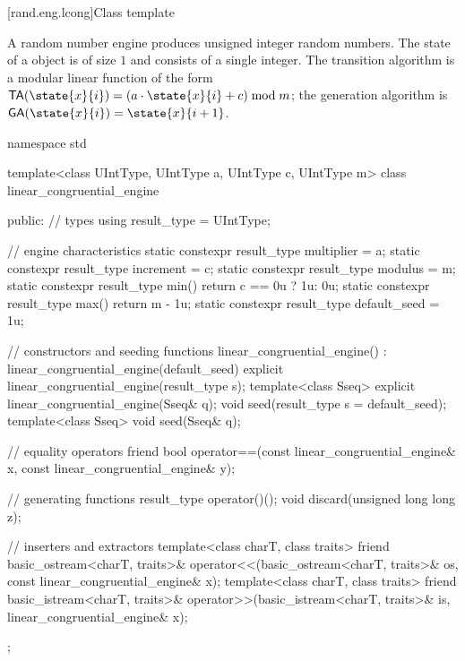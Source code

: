 
[rand.eng.lcong]{Class template }%
%

\pnum
A  random number engine
produces unsigned integer random numbers.
The state 
of a  object 
is of size $1$
and consists of a single integer.
The transition algorithm
is a modular linear function of the form
$\mathsf{TA}(\state{x}{i}) = (a \cdot \state{x}{i} + c) \bmod m$;
the generation algorithm
is $\mathsf{GA}(\state{x}{i}) = \state{x}{i+1}$.

%
%
\begin{codeblock}
namespace std {
  template<class UIntType, UIntType a, UIntType c, UIntType m>
  class linear_congruential_engine {
  public:
    // types
    using result_type = UIntType;

    // engine characteristics
    static constexpr result_type multiplier = a;
    static constexpr result_type increment = c;
    static constexpr result_type modulus = m;
    static constexpr result_type min() { return c == 0u ? 1u: 0u; }
    static constexpr result_type max() { return m - 1u; }
    static constexpr result_type default_seed = 1u;

    // constructors and seeding functions
    linear_congruential_engine() : linear_congruential_engine(default_seed) {}
    explicit linear_congruential_engine(result_type s);
    template<class Sseq> explicit linear_congruential_engine(Sseq& q);
    void seed(result_type s = default_seed);
    template<class Sseq> void seed(Sseq& q);

    // equality operators
    friend bool operator==(const linear_congruential_engine& x,
                           const linear_congruential_engine& y);

    // generating functions
    result_type operator()();
    void discard(unsigned long long z);

    // inserters and extractors
    template<class charT, class traits>
      friend basic_ostream<charT, traits>&
        operator<<(basic_ostream<charT, traits>& os, const linear_congruential_engine& x);
    template<class charT, class traits>
      friend basic_istream<charT, traits>&
        operator>>(basic_istream<charT, traits>& is, linear_congruential_engine& x);
  };
}
\end{codeblock}


